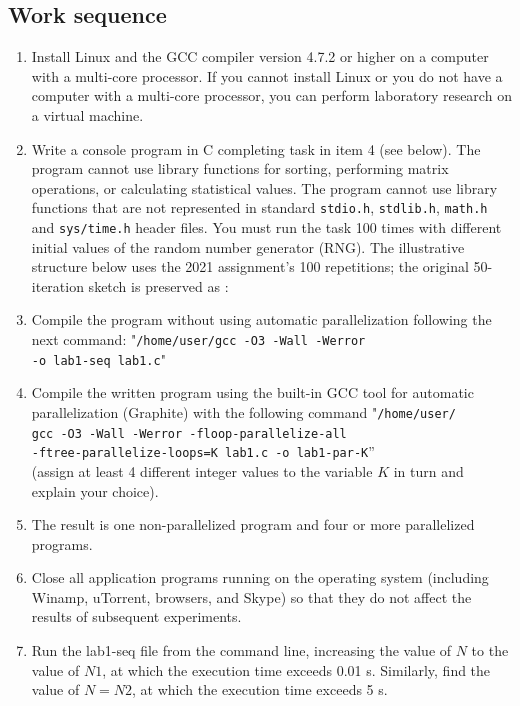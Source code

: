 { %
	\subsection{Work sequence}
	\begin{enumerate}
		\item Install Linux and the GCC compiler version 4.7.2 or higher on a computer with a multi-core processor. If you cannot install Linux or you do not have a computer with a multi-core processor, you can perform laboratory research on a virtual machine.
		\item Write a console program in C completing task in item 4 (see below). The program cannot use library functions for sorting, performing matrix operations, or calculating statistical values. The program cannot use library functions that are not represented in standard \texttt{stdio.h}, \texttt{stdlib.h}, \texttt{math.h} and \texttt{sys/time.h} header files. You must run the task 100 times with different initial values of the random number generator (RNG). The illustrative structure below uses the 2021 assignment's 100 repetitions; the original 50-iteration sketch is preserved as :
			\begin{figure}[H]
				
			\end{figure}
		\item Compile the program without using automatic parallelization following the next command: "\texttt{/home/user/gcc -O3 -Wall -Werror \\-o lab1-seq lab1.c}"
		\item Compile the written program using the built-in GCC tool for automatic parallelization (Graphite) with the following command  "\texttt{/home/user/\\gcc -O3 -Wall -Werror -floop-parallelize-all \\-ftree-parallelize-loops=K lab1.c -o lab1-par-K}” \\(assign at least 4 different integer values to the variable $ K $ in turn and explain your choice).
		\item The result is one non-parallelized program and four or more parallelized programs.
		\item Close all application programs running on the operating system (including Winamp, uTorrent, browsers, and Skype) so that they do not affect the results of subsequent experiments.
		\item Run the lab1-seq file from the command line, increasing the value of $ N $ to the value of $ N1 $, at which the execution time exceeds 0.01 s. Similarly, find the value of $ N=N2 $, at which the execution time exceeds 5 s.

\end{enumerate}}
